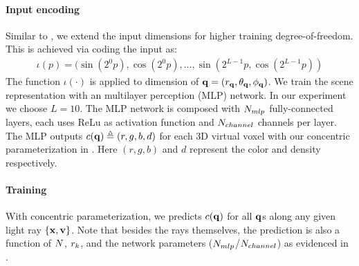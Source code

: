 \paragraph{Input encoding}

Similar to \cite{mildenhall2020nerf}, we extend the input dimensions for higher training degree-of-freedom. This is achieved via coding the input as:
\begin{align}
\iota (p) = (\sin(2^0 p), \cos(2^0 p), ..., \sin(2^{L-1}p, \cos(2^{L-1}p))
\label{eqn:inputencode}
\end{align}
The function $\iota (\cdot)$ is applied to dimension of $\mathbf{q}=(r_{\mathbf{q}},\theta_{\mathbf{q}}, \phi_{\mathbf{q}})$.
We train the scene representation with an multilayer perception (MLP) network. 
In our experiment we choose $L=10$. The MLP network is composed with $N_{mlp}$ fully-connected layers, each uses ReLu as activation function and $N_{channel}$ channels per layer. The MLP outputs $c(\mathbf{q})\triangleq(r,g,b,d)$ for each 3D virtual voxel with our concentric parameterization in . Here $(r,g,b)$ and $d$ represent the color and density respectively.

\paragraph{Training}
With concentric parameterization, we predicts  $c(\mathbf{q})$ for all $\mathbf{q}$s along any given light ray $\{\mathbf{x},\mathbf{v}\}$.  Note that besides the rays themselves, the prediction is also a function of  $N$, $r_k$, and the network parameters ($N_{mlp}$/$N_{channel}$) as evidenced in .

